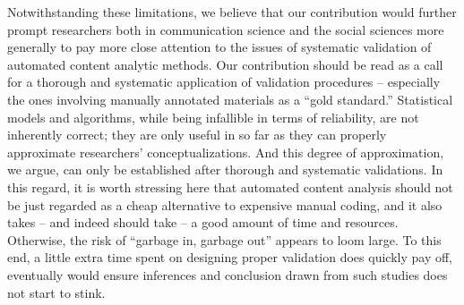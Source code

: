 \documentclass[man, 12pt, a4paper, nolmodern, noextraspace]{apa6}
\begin{document}
    Notwithstanding these limitations, we believe that our contribution would further prompt researchers both in communication science and the social sciences more generally to pay more close attention to the issues of systematic validation of automated content analytic methods. Our contribution should be read as a call for a thorough and systematic application of validation procedures -- especially the ones involving manually annotated materials as a \enquote{gold standard.} Statistical models and algorithms, while being infallible in terms of reliability, are not inherently correct; they are only useful in so far as they can properly approximate researchers' conceptualizations. And this degree of approximation, we argue, can only be established after thorough and systematic validations. In this regard, it is worth stressing here that automated content analysis should not be just regarded as a cheap alternative to expensive manual coding, and it also takes -- and indeed should take -- a good amount of time and resources. Otherwise, the risk of “garbage in, garbage out” appears to loom large. To this end, a little extra time spent on designing proper validation does quickly pay off, eventually would ensure inferences and conclusion drawn from such studies does not start to stink.

    
\printbibliography
\end{document}
